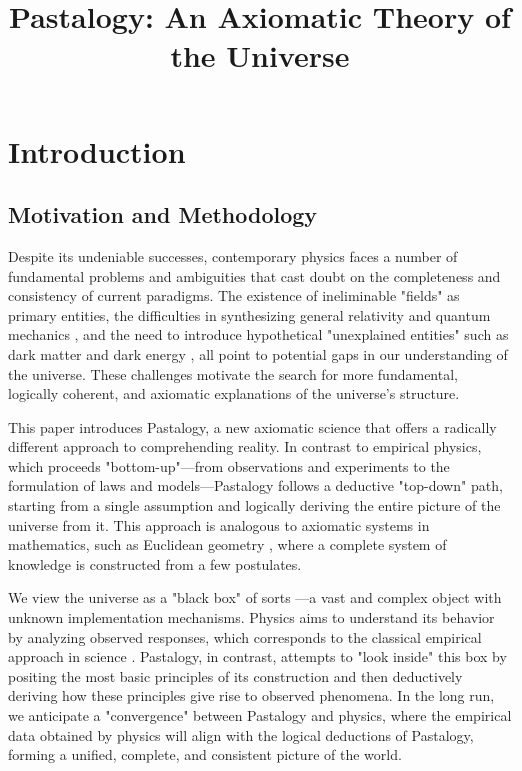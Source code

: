 \documentclass[pdflatex,sn-mathphys-num]{sn-jnl}
\title[Pastalogy]{Pastalogy: An Axiomatic Theory of the Universe}
\author*[1]{\fnm{Vladimir} \sur{Sitnikov}}\email{montenegrofsm@google.com}
\affil*[1]{\orgdiv{Independent Researcher}, \city{Bar}, \country{Montenegro}}
\begin{document}
\maketitle

\section{Introduction}\label{sec:introduction}

\subsection{Motivation and Methodology}\label{subsec:motivation-methodology}

Despite its undeniable successes, contemporary physics faces a number of fundamental problems and ambiguities that cast doubt on the completeness and consistency of current paradigms. The existence of ineliminable "fields" as primary entities, the difficulties in synthesizing general relativity \cite{einstein1916} and quantum mechanics \cite{bohr1928}, and the need to introduce hypothetical "unexplained entities" such as dark matter \cite{rubin1980} and dark energy \cite{riess1998}, all point to potential gaps in our understanding of the universe. These challenges motivate the search for more fundamental, logically coherent, and axiomatic explanations of the universe's structure.

This paper introduces Pastalogy, a new axiomatic science that offers a radically different approach to comprehending reality. In contrast to empirical physics, which proceeds "bottom-up"---from observations and experiments to the formulation of laws and models---Pastalogy follows a deductive "top-down" path, starting from a single assumption and logically deriving the entire picture of the universe from it. This approach is analogous to axiomatic systems in mathematics, such as Euclidean geometry \cite{euclid-elements-heath}, where a complete system of knowledge is constructed from a few postulates.

We view the universe as a "black box" of sorts \cite{wiener1948}---a vast and complex object with unknown implementation mechanisms. Physics aims to understand its behavior by analyzing observed responses, which corresponds to the classical empirical approach in science \cite{popper1959}. Pastalogy, in contrast, attempts to "look inside" this box by positing the most basic principles of its construction and then deductively deriving how these principles give rise to observed phenomena. In the long run, we anticipate a "convergence" between Pastalogy and physics, where the empirical data obtained by physics will align with the logical deductions of Pastalogy, forming a unified, complete, and consistent picture of the world.
\end{document}
